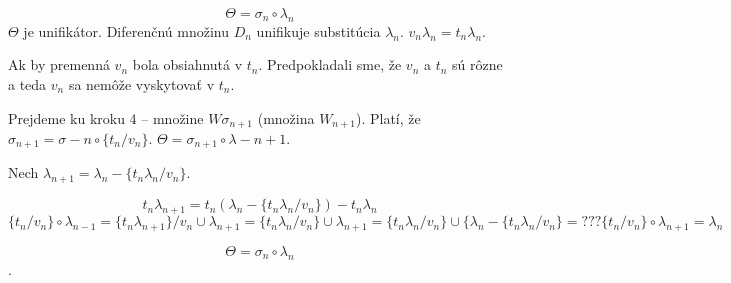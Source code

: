 $$\Theta = \sigma_n \circ \lambda_n$$ 
$\Theta$ je unifikátor. Diferenčnú množinu $D_n$ unifikuje substitúcia
$\lambda_n$. $v_n \lambda_n = t_n \lambda_n$.

\par Ak by premenná $v_n$ bola obsiahnutá v $t_n$. Predpokladali sme, že $v_n$ a
$t_n$ sú rôzne a teda $v_n$ sa nemôže vyskytovať v $t_n$.

\par Prejdeme ku kroku 4 -- množine $W\sigma_{n+1}$ (množina $W_{n+1}$). Platí,
že $\sigma_{n+1} = \sigma-n \circ \{ t_n/v_n \}$. $\Theta = \sigma_{n+1} \circ
\lambda-{n+1}$.

\par Nech $\lambda_{n+1} = \lambda_n - \{t_n\lambda_n/v_n\}$. 

$$t_n\lambda_{n+1} = t_n (\lambda_n - \{t_n\lambda_n / v_n\}) -  t_n\lambda_n$$
$$\{ t_n / v_n\} \circ \lambda_{n-1} = \{t_n \lambda_{n+1}\}/v_n \cup
\lambda_{n+1} = \{t_n\lambda_n /v_n\} \cup \lambda_{n+1} = \{t_n\lambda_n/v_n\}
\cup \{ \lambda_n - \{ t_n\lambda_n/v_n\} = ??? \{ t_n/v_n \} \circ
\lambda_{n+1} = \lambda_n$$

$$\Theta = \sigma_n \circ \lambda_n$$.

